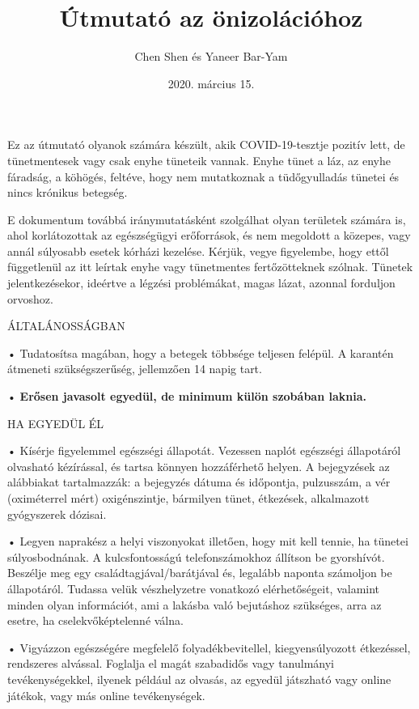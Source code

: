 \documentclass[twocolumn,journal]{IEEEtran}
\title{Útmutató az önizolációhoz}
\author{Chen Shen és Yaneer Bar-Yam}
\date{2020. március 15.}
\begin{document}
\maketitle
\thispagestyle{empty} %


Ez az útmutató olyanok számára készült, akik COVID-19-tesztje pozitív lett, de tünetmentesek vagy csak enyhe tüneteik vannak. Enyhe tünet a láz, az enyhe fáradság, a köhögés, feltéve, hogy nem mutatkoznak a tüdőgyulladás tünetei és nincs krónikus betegség.

E dokumentum továbbá iránymutatásként szolgálhat olyan területek számára is, ahol korlátozottak az egészségügyi erőforrások, és nem megoldott a közepes, vagy annál súlyosabb esetek kórházi kezelése. Kérjük, vegye figyelembe, hogy ettől függetlenül az itt leírtak enyhe vagy tünetmentes fertőzötteknek szólnak. Tünetek jelentkezésekor, ideértve a légzési problémákat, magas lázat, azonnal forduljon orvoshoz.

\begin{center}
ÁLTALÁNOSSÁGBAN
\end{center}

• Tudatosítsa magában, hogy a betegek többsége teljesen felépül. A
karantén átmeneti szükségszerűség, jellemzően 14 napig tart.

• \textbf{Erősen javasolt egyedül, de minimum külön szobában laknia.}

\begin{center}
HA EGYEDÜL ÉL
\end{center}

• Kísérje figyelemmel egészségi állapotát. Vezessen naplót egészségi állapotáról olvasható kézírással, és tartsa könnyen hozzáférhető helyen. A bejegyzések az alábbiakat tartalmazzák: a bejegyzés dátuma és időpontja, pulzusszám, a vér (oximéterrel mért) oxigénszintje, bármilyen tünet, étkezések, alkalmazott gyógyszerek dózisai.

• Legyen naprakész a helyi viszonyokat illetően, hogy mit kell tennie, ha tünetei súlyosbodnának. A kulcsfontosságú telefonszámokhoz állítson be gyorshívót. Beszélje meg egy családtagjával/barátjával és, legalább naponta számoljon be állapotáról. Tudassa velük vészhelyzetre vonatkozó elérhetőségeit, valamint minden olyan információt, ami a lakásba való bejutáshoz szükséges, arra az esetre, ha cselekvőképtelenné válna.

• Vigyázzon egészségére megfelelő folyadékbevitellel, kiegyensúlyozott étkezéssel, rendszeres alvással. Foglalja el magát szabadidős vagy tanulmányi tevékenységekkel, ilyenek például az olvasás, az egyedül játszható vagy online játékok, vagy más online tevékenységek.
\end{document}
